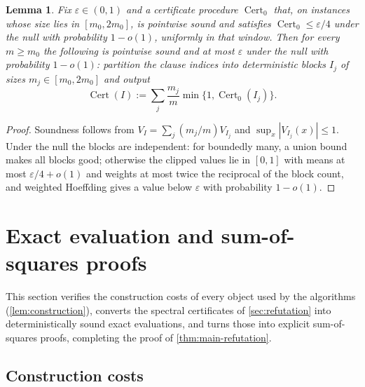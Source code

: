 \documentclass[11pt]{article}
\newtheorem{lemma}[lemma]{Lemma}
\theoremstyle{definition}
\theoremstyle{remark}
\newcommand{\1}{\mathbf 1}
\newcommand{\eps}{\varepsilon}
\DeclareMathOperator{\Cert}{Cert}
\numberwithin{equation}{section}
\begin{document}
\begin{lemma}\label{lem:blocking}
Fix $\eps\in(0,1)$ and a certificate procedure $\Cert_0$ that, on
instances whose size lies in $[m_0,2m_0]$, is pointwise sound and satisfies
$\Cert_0\le\eps/4$ under the null with probability $1-o(1)$, uniformly in
that window.  Then for every $m\ge m_0$ the following is pointwise sound
and at most $\eps$ under the null with probability $1-o(1)$: partition the
clause indices into deterministic blocks $I_j$ of sizes
$m_j\in[m_0,2m_0]$ and output
\[
 \Cert(I):=\sum_j\frac{m_j}m\min\{1,\Cert_0(I_j)\}.
\]
\end{lemma}
\begin{proof}
Soundness follows from $V_I=\sum_j(m_j/m)V_{I_j}$ and
$\sup_x|V_{I_j}(x)|\le1$.  Under the null the blocks are independent:
for boundedly many, a union bound makes all blocks good; otherwise the
clipped values lie in $[0,1]$ with means at most $\eps/4+o(1)$ and
weights at most twice the reciprocal of the block count, and weighted
Hoeffding gives a value below $\eps$ with probability $1-o(1)$.
\end{proof}

\section{Exact evaluation and sum-of-squares proofs}\label{sec:evaluation}

This section verifies the construction costs of every object used by
the algorithms (\cref{lem:construction}), converts the spectral
certificates of \cref{sec:refutation} into deterministically sound
exact evaluations, and turns those into explicit sum-of-squares proofs,
completing the proof of \cref{thm:main-refutation}.

\subsection{Construction costs}
\end{document}

